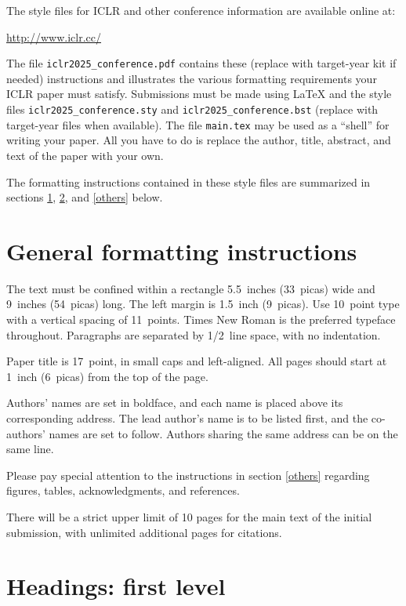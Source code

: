 \documentclass{article} %
\begin{document}
The style files for ICLR and other conference information are available online at:
\begin{center}
   \url{http://www.iclr.cc/}
\end{center}
The file \verb+iclr2025_conference.pdf+ contains these (replace with target-year kit if needed)
instructions and illustrates the
various formatting requirements your ICLR paper must satisfy.
Submissions must be made using \LaTeX{} and the style files
\verb+iclr2025_conference.sty+ and \verb+iclr2025_conference.bst+ (replace with target-year files when available). The file
\verb+main.tex+ may be used as a ``shell'' for writing your paper. All you
have to do is replace the author, title, abstract, and text of the paper with
your own.

The formatting instructions contained in these style files are summarized in
sections \ref{gen_inst}, \ref{headings}, and \ref{others} below.

\section{General formatting instructions}
\label{gen_inst}

The text must be confined within a rectangle 5.5~inches (33~picas) wide and
9~inches (54~picas) long. The left margin is 1.5~inch (9~picas).
Use 10~point type with a vertical spacing of 11~points. Times New Roman is the
preferred typeface throughout. Paragraphs are separated by 1/2~line space,
with no indentation.

Paper title is 17~point, in small caps and left-aligned.
All pages should start at 1~inch (6~picas) from the top of the page.

Authors' names are
set in boldface, and each name is placed above its corresponding
address. The lead author's name is to be listed first, and
the co-authors' names are set to follow. Authors sharing the
same address can be on the same line.

Please pay special attention to the instructions in section \ref{others}
regarding figures, tables, acknowledgments, and references.


There will be a strict upper limit of 10 pages for the main text of the initial submission, with unlimited additional pages for citations. 

\section{Headings: first level}
\label{headings}
\end{document}
